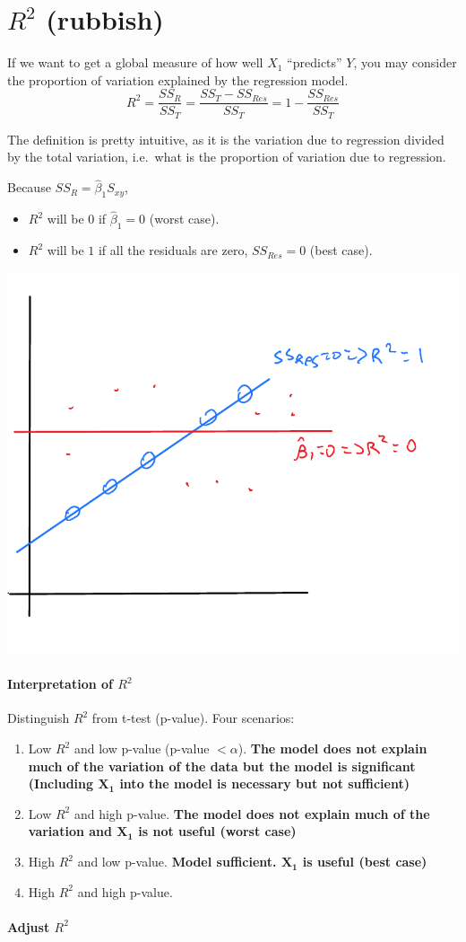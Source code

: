 \documentclass[12 pt]{article}
\begin{document}
    \section{$R^2$ (rubbish)}
    If we want to get a global measure of how well $X_1$ ``predicts''
    $Y$, you may consider the proportion of variation explained by the
    regression model.
    $$R^2 = \frac{SS_R}{SS_T} = \frac{SS_T - SS_{Res}}{SS_T} = 1 -
    \frac{SS_{Res}}{SS_T}$$

    The definition is pretty intuitive, as it is the variation due to
    regression divided by the total variation, i.e.\ what is the
    proportion of variation due to regression.

    Because $SS_R = \hat{\beta}_1 S_{xy}$,
    \begin{itemize}
    \item $R^2$ will be $0$ if $\hat{\beta}_1 = 0$ (worst case).
    \item $R^2$ will be $1$ if all the residuals are zero, $SS_{Res} =
      0$ (best case).
    \end{itemize}
    \includegraphics[width=.5\textwidth]{24.pdf}
    \paragraph{Interpretation of $R^2$}
    Distinguish $R^2$ from t-test (p-value). Four scenarios:
    \begin{enumerate}
    \item Low $R^2$ and low p-value (p-value $< \alpha$). \textbf{The
        model does not explain much of the variation of the data but the
        model is significant (Including $\mathbf{X_1}$ into the model is
        necessary but not sufficient)}
    \item Low $R^2$ and high p-value. \textbf{The model does not
        explain much of the variation and $\mathbf{X_1}$ is not useful
      (worst case)}
  \item High $R^2$ and low p-value. \textbf{Model
      sufficient. $\mathbf{X_1}$ is useful (best case)}
  \item High $R^2$ and high p-value.
  \end{enumerate}
  \paragraph{Adjust $R^2$}
\end{document}
